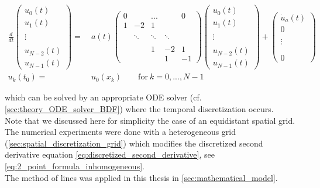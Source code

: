 \documentclass{scrartcl}[12pt, halfparskip]
\numberwithin{equation}{section}
\numberwithin{figure}{section}
\numberwithin{table}{section}
\begin{document}
\begin{align}
	\frac{d}{dt}
	\begin{pmatrix}
		u_0(t) \\
		u_1(t) \\
		\\
		\vdots \\
		\\
		u_{N-2}(t) \\
		u_{N-1}(t)
	\end{pmatrix}
	= & \ a(t) 
	\begin{pmatrix}
		0 & & ... & & 0 \\
		1 & -2 & 1 \\
		\\
		& \ddots & \ddots & \ddots \\
		\\
		& & 1 & -2 & 1 \\
		& & & 1 & -1
	\end{pmatrix}
	\begin{pmatrix}
	u_0(t) \\
	u_1(t) \\
	\\
	\vdots \\
	\\
	u_{N-2}(t) \\
	u_{N-1}(t)
	\end{pmatrix}
	+
	\begin{pmatrix}
		\dot{u}_a(t) \\
		0 \\
		\\
		\vdots \\
		\\
		\\
		0
	\end{pmatrix} \\
	u_k(t_0) = & \ u_0(x_k) \qquad \text{for} \ k = 0,...,N-1 \nonumber
\end{align}
 
 which can be solved by an appropriate ODE solver (cf. \cref{sec:theory_ODE_solver_BDF}) where the temporal discretization occurs. \\
 Note that we discussed here for simplicity the case of an equidistant spatial grid. The numerical experiments were done with a heterogeneous grid (\cref{sec:spatial_discretization_grid}) which modifies the discretized second derivative equation \eqref{eq:discretized_second_derivative}, see \cref{eq:2_point_formula_inhomogeneous}. \\
 The method of lines was applied in this thesis in \cref{sec:mathematical_model}.
\end{document}
